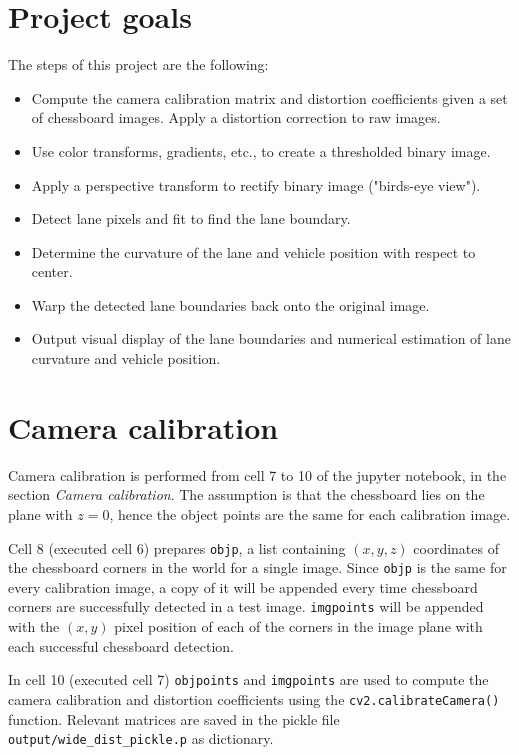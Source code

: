 \documentclass{article}
\let\cd\lstinline
\begin{document}
\section{Project goals}
The steps of this project are the following:
\begin{itemize}
\item Compute the camera calibration matrix and distortion coefficients given a set of chessboard images. Apply a distortion correction to raw images.
\item Use color transforms, gradients, etc., to create a thresholded binary image.
\item Apply a perspective transform to rectify binary image ("birds-eye view").
\item Detect lane pixels and fit to find the lane boundary.
\item Determine the curvature of the lane and vehicle position with respect to center.
\item Warp the detected lane boundaries back onto the original image.
\item Output visual display of the lane boundaries and numerical estimation of lane curvature and vehicle position.
\end{itemize}

\section{Camera calibration}
Camera calibration is performed from cell 7 to 10 of the jupyter notebook, in the section \textit{Camera calibration}. The assumption is that the chessboard lies on the plane with $z=0$, hence the object points are the same for each calibration image. 

Cell 8 (executed cell 6) prepares \cd+objp+, a list containing $(x, y, z)$ coordinates of the chessboard corners in the world for a single image. Since \cd+objp+ is the same for every calibration image, a copy of it will be appended  every time chessboard corners are successfully detected in a test image.
\cd+imgpoints+ will be appended with the $(x, y)$ pixel position of each of the corners in the image plane with each successful chessboard detection. 

In cell 10 (executed cell 7) \cd+objpoints+ and \cd+imgpoints+ are used to compute the camera calibration and distortion coefficients using the \cd+cv2.calibrateCamera()+ function. Relevant matrices are saved in the pickle file \cd+output/wide_dist_pickle.p+ as dictionary.
\end{document}
